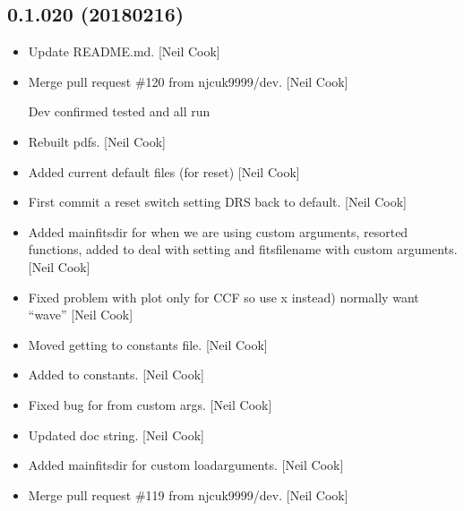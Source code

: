 \documentclass[a4paper,10pt,english]{report}
\begin{document}
\subsection{0.1.020 (2018\sphinxhyphen{}02\sphinxhyphen{}16)}
\label{\detokenize{misc/changelog:id503}}\begin{itemize}
\item {} 
Update README.md. {[}Neil Cook{]}

\item {} 
Merge pull request \#120 from njcuk9999/dev. {[}Neil Cook{]}

Dev \sphinxhyphen{} confirmed tested and all run

\item {} 
Rebuilt pdfs. {[}Neil Cook{]}

\item {} 
Added current default files (for reset) {[}Neil Cook{]}

\item {} 
First commit \sphinxhyphen{} a reset switch \sphinxhyphen{} setting DRS back to default. {[}Neil
Cook{]}

\item {} 
Added mainfitsdir for when we are using custom arguments, resorted
functions, added  to deal with
setting  and fitsfilename with custom arguments. {[}Neil
Cook{]}

\item {} 
Fixed problem with plot  only for CCF \sphinxhyphen{} so use x instead)
normally want “wave” {[}Neil Cook{]}

\item {} 
Moved  getting to constants file. {[}Neil Cook{]}

\item {} 
Added  to constants. {[}Neil Cook{]}

\item {} 
Fixed bug for  from custom args. {[}Neil Cook{]}

\item {} 
Updated doc string. {[}Neil Cook{]}

\item {} 
Added mainfitsdir for custom loadarguments. {[}Neil Cook{]}

\item {} 
Merge pull request \#119 from njcuk9999/dev. {[}Neil Cook{]}


\end{itemize}
\end{document}

